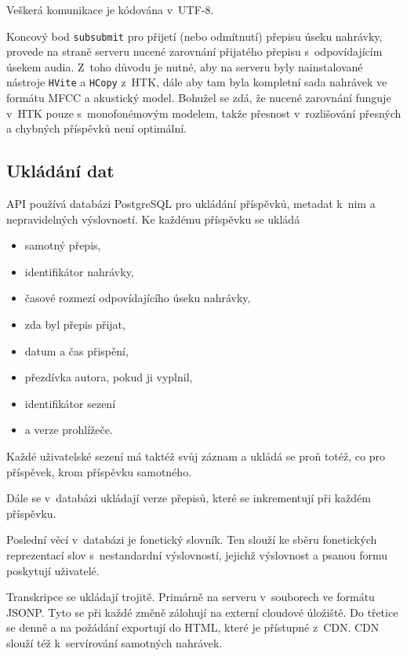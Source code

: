 Veškerá komunikace je kódována v~UTF-8.

Koncový bod \texttt{subsubmit} pro přijetí (nebo odmítnutí) přepisu úseku
nahrávky, provede na straně serveru nucené zarovnání přijatého přepisu
s~odpovídajícím úsekem audia. Z~toho důvodu je nutné, aby na serveru byly
nainstalované nástroje \texttt{HVite} a \texttt{HCopy} z~HTK, dále aby tam byla
kompletní sada nahrávek ve formátu MFCC a akustický model. Bohužel se zdá, že
nucené zarovnání funguje v~HTK pouze s~monofonémovým modelem, takže přesnost
v~rozlišování přesných a chybných příspěvků není optimální.

\subsection{Ukládání dat}

API používá databázi PostgreSQL pro ukládání příspěvků, metadat k~nim a nepravidelných
výslovností. Ke každému příspěvku se ukládá
\begin{itemize}
\item{samotný přepis,}
\item{identifikátor nahrávky,}
\item{časové rozmezí odpovídajícího úseku nahrávky,}
\item{zda byl přepis přijat,}
\item{datum a čas přispění,}
\item{přezdívka autora, pokud ji vyplnil,}
\item{identifikátor sezení}
\item{a verze prohlížeče.}
\end{itemize}

Každé uživatelské sezení má taktéž svůj záznam a ukládá se proň totéž, co pro
příspěvek, krom příspěvku samotného.

Dále se v~databázi ukládají verze přepisů, které se inkrementují při každém
příspěvku.

Poslední věcí v~databázi je fonetický slovník. Ten slouží ke sběru fonetických
reprezentací slov s~nestandardní výslovností, jejichž výslovnost a psanou formu
poskytují uživatelé.

Transkripce se ukládají trojitě. Primárně na serveru v~souborech ve formátu JSONP.
Tyto se při každé změně zálohují na externí cloudové úložiště. Do třetice se
denně a na požádání exportují do HTML, které je přístupné z~CDN.
CDN slouží též k~servírování samotných nahrávek.

